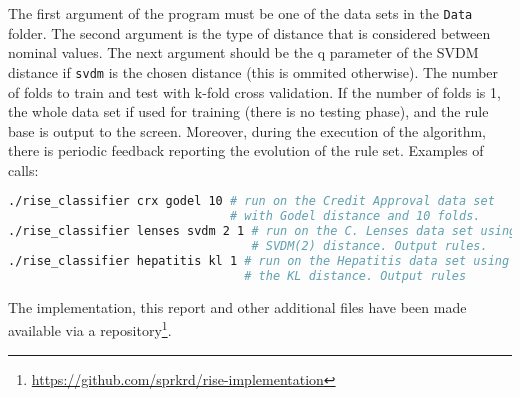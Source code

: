 \documentclass[a4paper]{article}
\begin{document}
The first argument of the program must be one of the data sets in the \texttt{Data} folder. The second argument is the type of distance that is considered between nominal values. The next argument should be the q parameter of the SVDM distance if \texttt{svdm} is the chosen distance (this is ommited otherwise). The number of folds to train and test with k-fold cross validation. If the number of folds is 1, the whole data set if used for training (there is no testing phase), and the rule base is output to the screen. Moreover, during the execution of the algorithm, there is periodic feedback reporting the evolution of the rule set. Examples of calls:
\begin{lstlisting}[language=bash,frame=single]
./rise_classifier crx godel 10 # run on the Credit Approval data set
                               # with Godel distance and 10 folds.
./rise_classifier lenses svdm 2 1 # run on the C. Lenses data set using
                                  # SVDM(2) distance. Output rules.
./rise_classifier hepatitis kl 1 # run on the Hepatitis data set using
                                 # the KL distance. Output rules
\end{lstlisting}

The implementation, this report and other additional files have been made available via a repository\footnote{\url{https://github.com/sprkrd/rise-implementation}}.



\end{document}
